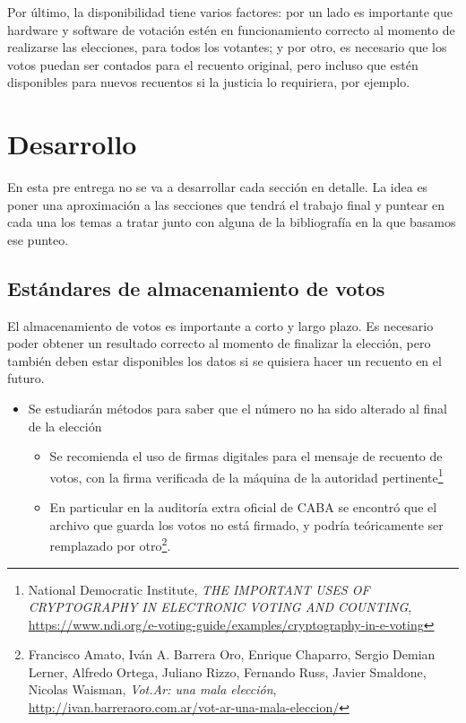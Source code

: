 \documentclass[a4,11pt]{article}
\begin{document}
Por último, la disponibilidad tiene varios factores: por un lado es importante que hardware y software de votación estén en funcionamiento correcto al momento de realizarse las elecciones, para todos los votantes; y por otro, es necesario que los votos puedan ser contados para el recuento original, pero incluso que estén disponibles para nuevos recuentos si la justicia lo requiriera, por ejemplo.

\section{Desarrollo}

En esta pre entrega no se va a desarrollar cada sección en detalle. La idea es poner una aproximación a las secciones que tendrá el trabajo final y puntear en cada una los temas a tratar junto con alguna de la bibliografía en la que basamos ese punteo.

\subsection{Estándares de almacenamiento de votos}

El almacenamiento de votos es importante a corto y largo plazo. Es necesario poder obtener un resultado correcto al momento de finalizar la elección, pero también deben estar disponibles los datos si se quisiera hacer un recuento en el futuro.

\begin{itemize}
\item Se estudiarán métodos para saber que el número no ha sido alterado al final de la elección
\begin{itemize}
\item Se recomienda el uso de firmas digitales para el mensaje de recuento de votos, con la firma verificada de la máquina de la autoridad pertinente\footnote{National Democratic Institute, \textit{THE IMPORTANT USES OF CRYPTOGRAPHY IN ELECTRONIC VOTING AND COUNTING}, \url{https://www.ndi.org/e-voting-guide/examples/cryptography-in-e-voting}}
\item En particular en la auditoría extra oficial de CABA se encontró que el archivo que guarda los votos no está firmado, y podría teóricamente ser remplazado por otro\footnote{Francisco Amato, Iván A. Barrera Oro, Enrique Chaparro, Sergio Demian Lerner, Alfredo Ortega, Juliano Rizzo, Fernando Russ, Javier Smaldone, Nicolas Waisman, \textit{Vot.Ar: una mala elección}, \url{http://ivan.barreraoro.com.ar/vot-ar-una-mala-eleccion/}}.
\end{itemize}
\end{itemize}
\end{document}
